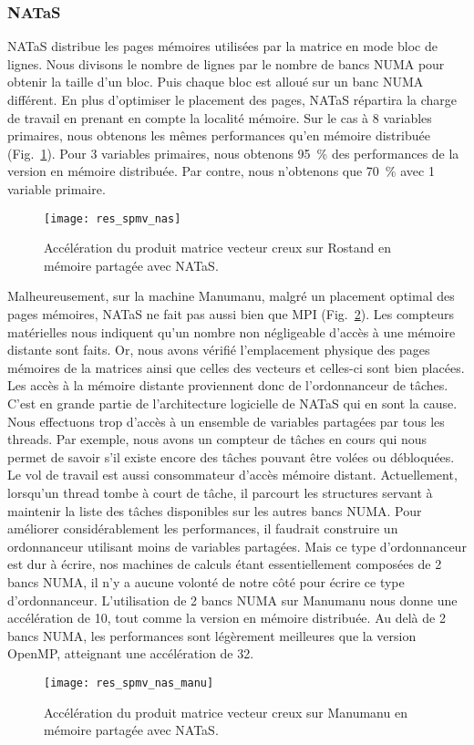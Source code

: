 \subsubsection{NATaS}
NATaS distribue les pages mémoires utilisées par la matrice en mode bloc de lignes.
%
Nous divisons le nombre de lignes par le nombre de bancs NUMA pour obtenir la taille d'un bloc.
%
Puis chaque bloc est alloué sur un banc NUMA différent.
%
En plus d'optimiser le placement des pages, NATaS répartira la charge de travail en prenant en compte la localité mémoire.
%
Sur le cas à 8 variables primaires, nous obtenons les mêmes performances qu'en mémoire distribuée (Fig.~\ref{fig:res_spmv_nas}).
%
Pour 3 variables primaires, nous obtenons 95~\% des performances de la version en mémoire distribuée.
%
Par contre, nous n'obtenons que 70~\% avec 1 variable primaire.

\begin{figure}
  \centering
  \texttt{[image: res\_spmv\_nas]}
  \caption{Accélération du produit matrice vecteur creux sur Rostand en mémoire partagée avec NATaS.}
  \label{fig:res_spmv_nas}
\end{figure}


Malheureusement, sur la machine Manumanu, malgré un placement optimal des pages mémoires, NATaS ne fait pas aussi bien que MPI (Fig.~\ref{fig:res_spmv_nas_manumanu}).
%
Les compteurs matérielles nous indiquent qu'un nombre non négligeable d'accès à une mémoire distante sont faits.
%
Or, nous avons vérifié l'emplacement physique des pages mémoires de la matrices ainsi que celles des vecteurs et celles-ci sont bien placées.
%
Les accès à la mémoire distante proviennent donc de l'ordonnanceur de tâches.
%
C'est en grande partie de l'architecture logicielle de NATaS qui en sont la cause.
%
Nous effectuons trop d'accès à un ensemble de variables partagées par tous les threads.
%
Par exemple, nous avons un compteur de tâches en cours qui nous permet de savoir s'il existe encore des tâches pouvant être volées ou débloquées.
%
Le vol de travail est aussi consommateur d'accès mémoire distant.
%
Actuellement, lorsqu'un thread tombe à court de tâche, il parcourt les structures servant à maintenir la liste des tâches disponibles sur les autres bancs NUMA.
%
Pour améliorer considérablement les performances, il faudrait construire un ordonnanceur utilisant moins de variables partagées.
%
Mais ce type d'ordonnanceur est dur à écrire, nos machines de calculs étant essentiellement composées de 2 bancs NUMA, il n'y a aucune volonté de notre côté pour écrire ce type d'ordonnanceur.
%
L'utilisation de 2 bancs NUMA sur Manumanu nous donne une accélération de 10, tout comme la version en mémoire distribuée.
%
Au delà de 2 bancs NUMA, les performances sont légèrement meilleures que la version OpenMP, atteignant une accélération de 32.

\begin{figure}
  \centering
  \texttt{[image: res\_spmv\_nas\_manu]}
  \caption{Accélération du produit matrice vecteur creux sur Manumanu en mémoire partagée avec NATaS.}
  \label{fig:res_spmv_nas_manumanu}
\end{figure}
